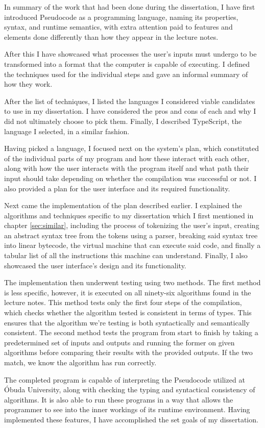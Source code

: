 In summary of the work that had been done during the dissertation, I have first introduced Pseudocode as a programming language, naming its properties, syntax, and runtime semantics, with extra attention paid to features and elements done differently than how they appear in the lecture notes.

After this I have showcased what processes the user's inputs must undergo to be transformed into a format that the computer is capable of executing. I defined the techniques used for the individual steps and gave an informal summary of how they work.

After the list of techniques, I listed the languages I considered viable candidates to use in my dissertation. I have considered the pros and cons of each and why I did not ultimately choose to pick them. Finally, I described TypeScript, the language I selected, in a similar fashion.

Having picked a language, I focused next on the system's plan, which constituted of the individual parts of my program and how these interact with each other, along with how the user interacts with the program itself and what path their input should take depending on whether the compilation was successful or not. I also provided a plan for the user interface and its required functionality.

Next came the implementation of the plan described earlier. I explained the algorithms and techniques specific to my dissertation which I first mentioned in chapter \ref{sec:similar}, including the process of tokenizing the user's input, creating an abstract syntax tree from the tokens using a parser, breaking said syntax tree into linear bytecode, the virtual machine that can execute said code, and finally a tabular list of all the instructions this machine can understand. Finally, I also showcased the user interface's design and its functionality.

The implementation then underwent testing using two methods. The first method is less specific, however, it is executed on all ninety-six algorithms found in the lecture notes. This method tests only the first four steps of the compilation, which checks whether the algorithm tested is consistent in terms of types. This ensures that the algorithm we're testing is both syntactically and semantically consistent. The second method tests the program from start to finish by taking a predetermined set of inputs and outputs and running the former on given algorithms before comparing their results with the provided outputs. If the two match, we know the algorithm has run correctly.

The completed program is capable of interpreting the Pseudocode utilized at Óbuda University, along with checking the typing and syntactical consistency of algorithms. It is also able to run these programs in a way that allows the programmer to see into the inner workings of its runtime environment. Having implemented these features, I have accomplished the set goals of my dissertation.